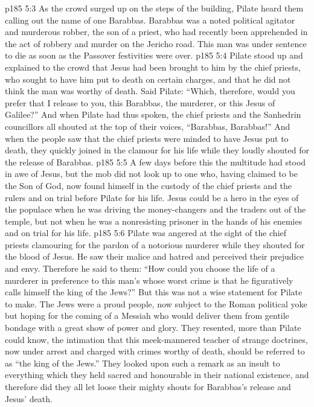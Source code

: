 \vs p185 5:3 As the crowd surged up on the steps of the building, Pilate heard them calling out the name of one Barabbas. Barabbas was a noted political agitator and murderous robber, the son of a priest, who had recently been apprehended in the act of robbery and murder on the Jericho road. This man was under sentence to die as soon as the Passover festivities were over.
\vs p185 5:4 Pilate stood up and explained to the crowd that Jesus had been brought to him by the chief priests, who sought to have him put to death on certain charges, and that he did not think the man was worthy of death. Said Pilate: “Which, therefore, would you prefer that I release to you, this Barabbas, the murderer, or this Jesus of Galilee?” And when Pilate had thus spoken, the chief priests and the Sanhedrin councillors all shouted at the top of their voices, “Barabbas, Barabbas!” And when the people saw that the chief priests were minded to have Jesus put to death, they quickly joined in the clamour for his life while they loudly shouted for the release of Barabbas.
\vs p185 5:5 A few days before this the multitude had stood in awe of Jesus, but the mob did not look up to one who, having claimed to be the Son of God, now found himself in the custody of the chief priests and the rulers and on trial before Pilate for his life. Jesus could be a hero in the eyes of the populace when he was driving the money\hyp{}changers and the traders out of the temple, but not when he was a nonresisting prisoner in the hands of his enemies and on trial for his life.
\vs p185 5:6 Pilate was angered at the sight of the chief priests clamouring for the pardon of a notorious murderer while they shouted for the blood of Jesus. He saw their malice and hatred and perceived their prejudice and envy. Therefore he said to them: “How could you choose the life of a murderer in preference to this man’s whose worst crime is that he figuratively calls himself the king of the Jews?” But this was not a wise statement for Pilate to make. The Jews were a proud people, now subject to the Roman political yoke but hoping for the coming of a Messiah who would deliver them from gentile bondage with a great show of power and glory. They resented, more than Pilate could know, the intimation that this meek\hyp{}mannered teacher of strange doctrines, now under arrest and charged with crimes worthy of death, should be referred to as “the king of the Jews.” They looked upon such a remark as an insult to everything which they held sacred and honourable in their national existence, and therefore did they all let loose their mighty shouts for Barabbas’s release and Jesus’ death.
